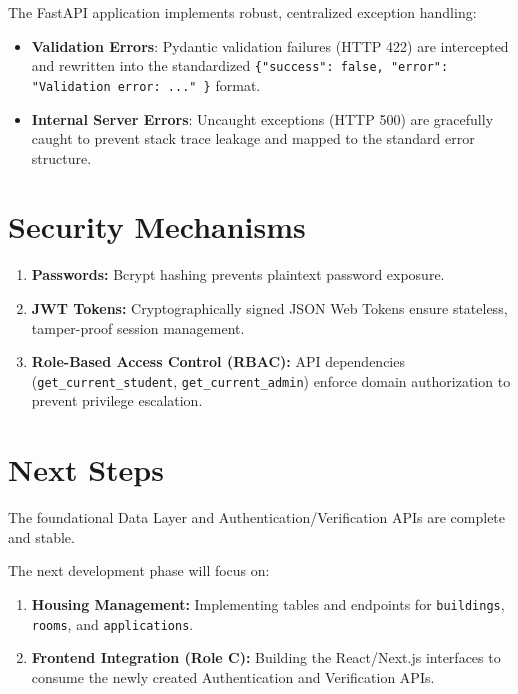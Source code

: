 \documentclass[12pt,a4paper]{article}
\begin{document}
The FastAPI application implements robust, centralized exception handling:
\begin{itemize}[noitemsep]
    \item \textbf{Validation Errors}: Pydantic validation failures (HTTP 422) are intercepted and rewritten into the standardized \texttt{\{"success": false, "error": "Validation error: ..." \}} format.
    \item \textbf{Internal Server Errors}: Uncaught exceptions (HTTP 500) are gracefully caught to prevent stack trace leakage and mapped to the standard error structure.
\end{itemize}

\section{Security Mechanisms}

\begin{enumerate}
    \item \textbf{Passwords:} Bcrypt hashing prevents plaintext password exposure.
    \item \textbf{JWT Tokens:} Cryptographically signed JSON Web Tokens ensure stateless, tamper-proof session management.
    \item \textbf{Role-Based Access Control (RBAC):} API dependencies (\texttt{get\_current\_student}, \texttt{get\_current\_admin}) enforce domain authorization to prevent privilege escalation.
\end{enumerate}

\section{Next Steps}

The foundational Data Layer and Authentication/Verification APIs are complete and stable. 

The next development phase will focus on:
\begin{enumerate}
    \item \textbf{Housing Management:} Implementing tables and endpoints for \texttt{buildings}, \texttt{rooms}, and \texttt{applications}.
    \item \textbf{Frontend Integration (Role C):} Building the React/Next.js interfaces to consume the newly created Authentication and Verification APIs.
\end{enumerate}
\end{document}

